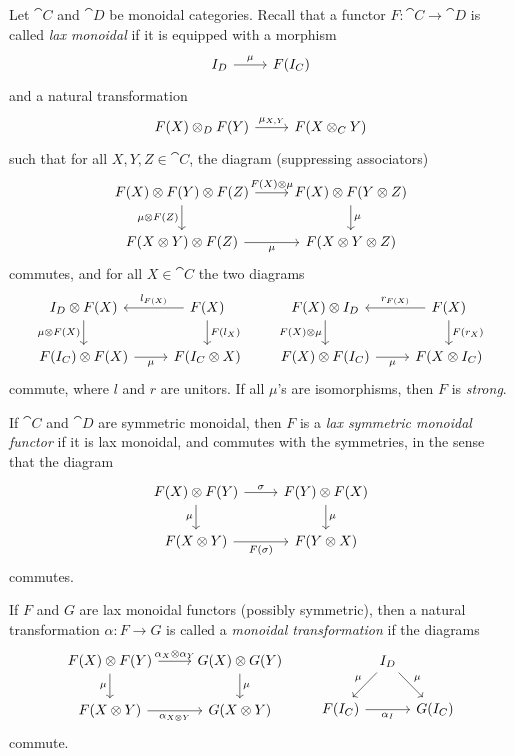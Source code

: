 \documentclass[11pt,oneside,article]{memoir}
\begin{document}
Let $\cat{C}$ and $\cat{D}$ be monoidal categories. Recall that a functor
$F\colon\cat{C}\to\cat{D}$ is called \emph{lax monoidal} if it is equipped with a morphism
\[
\begin{tikzcd}
   I_D \rar{\mu} & F(I_C)
\end{tikzcd}
\]
and a natural transformation
\[
\begin{tikzcd}
   F(X) \otimes_D F(Y) \rar{\mu_{X,Y}} & F(X\otimes_C Y)
\end{tikzcd}
\]
such that for all $X,Y,Z\in\cat{C}$, the diagram (suppressing associators)
\[
\begin{tikzcd}
   F(X)\otimes F(Y) \otimes F(Z)
      \rar{F(X)\otimes\mu}
      \dar[swap]{\mu\otimes F(Z)}
   & F(X)\otimes F(Y\otimes Z)
      \dar{\mu} \\
   F(X\otimes Y)\otimes F(Z)
      \rar[swap]{\mu}
   & F(X\otimes Y\otimes Z)
\end{tikzcd}
\]
commutes, and for all $X\in\cat{C}$ the two diagrams
\[
\begin{tikzcd}
   I_D\otimes F(X)
      \dar[swap]{\mu\otimes F(X)}
   & F(X)
      \lar[swap]{l_{F(X)}}
      \dar{F(l_X)} \\
   F(I_C)\otimes F(X)
      \rar[swap]{\mu}
   & F(I_C\otimes X)
\end{tikzcd}
\qquad
\begin{tikzcd}
   F(X) \otimes I_D
      \dar[swap]{F(X)\otimes\mu}
   & F(X)
      \lar[swap]{r_{F(X)}}
      \dar{F(r_X)} \\
   F(X)\otimes F(I_C)
      \rar[swap]{\mu}
   & F(X\otimes I_C)
\end{tikzcd}
\]
commute, where $l$ and $r$ are unitors.
If all $\mu$'s are isomorphisms, then $F$ is \emph{strong}.

If $\cat{C}$ and $\cat{D}$ are symmetric monoidal, then $F$ is a \emph{lax symmetric monoidal
functor} if it is lax monoidal, and commutes with the symmetries, in the sense that the diagram
\[
\begin{tikzcd}
   F(X)\otimes F(Y)
      \rar{\sigma}
      \dar[swap]{\mu}
   & F(Y)\otimes F(X)
      \dar{\mu} \\
   F(X\otimes Y)
      \rar[swap]{F(\sigma)}
   & F(Y\otimes X)
\end{tikzcd}
\]
commutes.

If $F$ and $G$ are lax monoidal functors (possibly symmetric), then a natural transformation
$\alpha\colon F\to G$ is called a \emph{monoidal transformation} if the diagrams
\[
\begin{tikzcd}
   F(X)\otimes F(Y)
      \rar{\alpha_X\otimes\alpha_Y}
      \dar[swap]{\mu}
   & G(X)\otimes G(Y)
      \dar{\mu} \\
   F(X\otimes Y)
      \rar[swap]{\alpha_{X\otimes Y}}
   & G(X\otimes Y)
\end{tikzcd}
\qquad
\begin{tikzcd}[column sep=tiny]
   {} & I_D \dlar[swap]{\mu} \drar{\mu} & \\
   F(I_C) \ar{rr}[swap]{\alpha_I} && G(I_C)
\end{tikzcd}
\]
commute.
\end{document}
